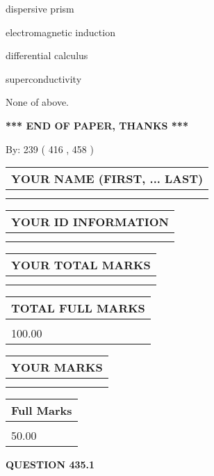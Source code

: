 \documentclass[12pt]{article}
\begin{document}
 
dispersive prism
 
 
electromagnetic induction
 
 
differential calculus
 
 
superconductivity
 
 
 None of above.
 
 
   
   
\vspace{1.0in} 
{\textbf{\large{ *** END OF PAPER, THANKS *** }}} 
   
   
\hspace{1.0in} By: 
 239 ( 416 ,  458 )
   
   
   
   
\newpage 
\setcounter{page}{ 
   435001 } 
   
   
   
   
\noindent\begin{tabular}{|l|}
\hline
YOUR NAME (FIRST, ... LAST)  \\
\hline
 \\ 
 \\ 
\hline
\end{tabular}
\hspace{0.05in} \begin{tabular}{|l|}
\hline
 YOUR   ID   INFORMATION  \\
\hline
 \\ 
 \\ 
\hline
\end{tabular}
   
   
\vspace{0.2in}\noindent\begin{tabular}{|l|}
\hline
YOUR TOTAL MARKS  \\
\hline
 \\ 
 \\ 
\hline
\end{tabular}
\hspace{0.05in} \begin{tabular}{|l|}
\hline
TOTAL FULL MARKS  \\
\hline
 \\ 
100.00 \\
\hline
\end{tabular}
  
\vspace{0.2in}
  
\noindent\begin{tabular}{|l|}
\hline
 YOUR MARKS  \\
\hline
 \\ 
 \\ 
\hline
\end{tabular}
\hspace{0.05in} \begin{tabular}{|l|}
\hline
 Full Marks  \\
\hline
 \\ 
50.00 \\
\hline
\end{tabular}
{\textbf{\Large{QUESTION
435.1 
}}}
  
\end{document}
